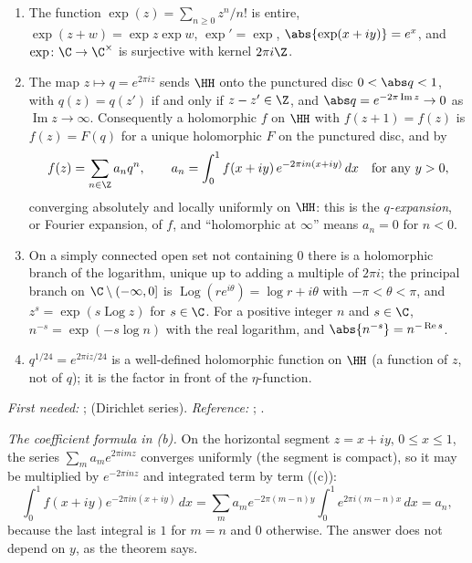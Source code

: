 \begin{theorem}\label{thm:prereq:exp}
\leavevmode
\begin{enumerate}[label=(\alph*)]
\item The function $\exp(z)=\sum_{n\ge0}z^n/n!$ is entire, $\exp(z+w)=\exp z\exp w$, $\exp'=\exp$,
$\abs{\exp(x+iy)}=e^x$, and $\exp\colon\C\to\C^\times$ is surjective with kernel $2\pi i\Z$.
\item The map $z\mapsto q=e^{2\pi iz}$ sends $\HH$ onto the punctured disc $0<\abs q<1$, with
$q(z)=q(z')$ if and only if $z-z'\in\Z$, and $\abs q=e^{-2\pi\operatorname{Im}z}\to0$ as
$\operatorname{Im}z\to\infty$. Consequently a holomorphic $f$ on $\HH$ with $f(z+1)=f(z)$ is
$f(z)=F(q)$ for a unique holomorphic $F$ on the punctured disc, and by 
\[
f(z)=\sum_{n\in\Z}a_nq^n,\qquad a_n=\int_0^1f(x+iy)\,e^{-2\pi in(x+iy)}\,dx\quad\text{for any }y>0,
\]
converging absolutely and locally uniformly on $\HH$: this is the \emph{$q$-expansion}, or Fourier
expansion, of $f$, and ``holomorphic at $\infty$'' means $a_n=0$ for $n<0$.
\item On a simply connected open set not containing $0$ there is a holomorphic branch of the
logarithm, unique up to adding a multiple of $2\pi i$; the principal branch on
$\C\setminus(-\infty,0]$ is $\operatorname{Log}(re^{i\theta})=\log r+i\theta$ with $-\pi<\theta<\pi$,
and $z^s=\exp(s\operatorname{Log}z)$ for $s\in\C$. For a positive integer $n$ and $s\in\C$,
$n^{-s}=\exp(-s\log n)$ with the real logarithm, and $\abs{n^{-s}}=n^{-\operatorname{Re}s}$.
\item $q^{1/24}=e^{2\pi iz/24}$ is a well-defined holomorphic function on $\HH$ (a function of
$z$, not of $q$); it is the factor in front of the $\eta$-function.
\end{enumerate}
\end{theorem}
\noindent\emph{First needed:} ;  (Dirichlet series).
\emph{Reference:} \cite[Chapter 2, Section 3]{Ahlfors79}; \cite[Chapter 1]{DiamondShurman}.

\emph{The coefficient formula in (b).} On the horizontal segment $z=x+iy$, $0\le x\le1$, the series
$\sum_ma_me^{2\pi imz}$ converges uniformly (the segment is compact), so it may be multiplied by
$e^{-2\pi inz}$ and integrated term by term ((c)):
\[
\int_0^1f(x+iy)e^{-2\pi in(x+iy)}\,dx=\sum_ma_me^{-2\pi(m-n)y}\int_0^1e^{2\pi i(m-n)x}\,dx=a_n,
\]
because the last integral is $1$ for $m=n$ and $0$ otherwise. The answer does not depend on $y$, as
the theorem says.


